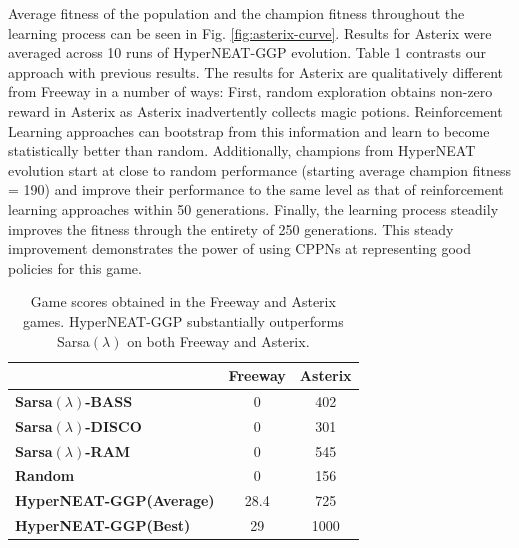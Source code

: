 \documentclass{sig-alternate}
\begin{document}
Average fitness of the population and the champion fitness throughout the learning process can be seen in Fig. \ref{fig:asterix-curve}. Results for Asterix were averaged across 10 runs of HyperNEAT-GGP evolution. Table 1 contrasts our approach with previous results. The results for Asterix are qualitatively different from Freeway in a number of ways: First, random exploration obtains non-zero reward in Asterix as Asterix inadvertently collects magic potions. Reinforcement Learning approaches can bootstrap from this information and learn to become statistically better than random. Additionally, champions from HyperNEAT evolution start at close to random performance (starting average champion fitness = 190) and improve their performance to the same level as that of reinforcement learning approaches within 50 generations. Finally, the learning process steadily improves the fitness through the entirety of 250 generations. This steady improvement demonstrates the power of using CPPNs at representing good policies for this game.


\begin{table}
\begin{center}
\begin{tabular}{|l|c|c|}
\hline
~ & \textbf{Freeway} & \textbf{Asterix} \\ \hline
\textbf{Sarsa$(\lambda)$-BASS} & 0 & 402 \\ \hline
\textbf{Sarsa$(\lambda)$-DISCO} & 0 & 301 \\ \hline
\textbf{Sarsa$(\lambda)$-RAM} & 0 & 545 \\ \hline
\textbf{Random} & 0 & 156 \\ \hline
\textbf{HyperNEAT-GGP(Average)} & 28.4 & 725 \\ \hline
\textbf{HyperNEAT-GGP(Best)} & 29 & 1000 \\ 
\hline
\end{tabular}
\end{center}
\caption{Game scores obtained in the Freeway and Asterix games. HyperNEAT-GGP substantially outperforms Sarsa$(\lambda)$ on both Freeway and Asterix.}
\end{table}
\end{document}

